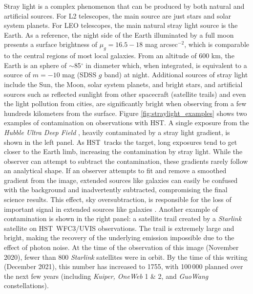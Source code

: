 \documentclass[usenames,dvipsnames,modern]{CLASS_FILES/aastex631}  %
\newcommand{\Hubble}{HST}
\newcommand{\magarc}{mag arcsec\ensuremath{^{\mathrm{-2}}}}
\begin{document}
Stray light is a complex phenomenon that can be produced by both natural and artificial sources. For L2 telescopes, the main source are just stars and solar system planets. For LEO telescopes, the main natural stray light source is the Earth. As a reference, the night side of the Earth illuminated by a full moon presents a surface brightness of $\mu_{g}=16.5-18$ \magarc, which is comparable to the central regions of most local galaxies. From an altitude of 600 km, the Earth is an sphere of $\sim$85$^\circ$ in diameter which, when integrated, is equivalent to a source of $m=-10$ mag (SDSS $g$ band) at night. Additional sources of stray light include the Sun, the Moon, solar system planets, and bright stars, and artificial sources such as reflected sunlight from other spacecraft (satellite trails) and even the light pollution from cities, are significantly bright when observing from a few hundreds kilometers from the surface. Figure \ref{fig:straylight_examples} shows two examples of contamination on observations with \Hubble. A single exposure from the \emph{Hubble Ultra Deep Field} \citep{beckwith+2006aj132_1729, illingworth+2013apj209_6,koekemoer+2013apj209_3}, heavily contaminated by a stray light gradient, is shown in the left panel. As \Hubble\ tracks the target, long exposures tend to get closer to the Earth limb, increasing the contamination by stray light. While the observer can attempt to subtract the contamination, these gradients rarely follow an analytical shape. If an observer attempts to fit and remove a smoothed gradient from the image, extended sources like galaxies can easily be confused with the background and inadvertently subtracted, compromising the final science results. This effect,  sky oversubtraction, is responsible for the loss of important signal in extended sources like galaxies \citep{aihara+2011apj193_29}. Another example of contamination is shown in the right panel: a satellite trail created by a \emph{Starlink} satellite on \Hubble\ WFC3/UVIS observations. The trail is extremely large and bright, making the recovery of the underlying emission impossible due to the effect of photon noise. At the time of the observation of this image (November 2020), fewer than 800 \emph{Starlink} satellites were in orbit. By the time of this writing (December 2021), this number has increased to 1755, with 100\,000  planned over the next few years (including \emph{Kuiper, OneWeb} 1 \& 2, and \emph{GuoWang} constellations).\\

\end{document}
